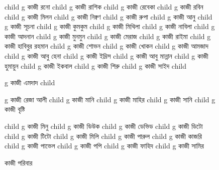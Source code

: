 \documentclass{article}
\begin{document}
\begin{figure}
{\begin{genealogypicture}
{{{{              child{    g{ কাজী রনো  } child{    g{ কাজী রাশিক  }   }   }
              child{    g{ কাজী রেবেকা } 
                  child{    g{ কাজী রবিন }   }
                  child{    g{ কাজী মিলন }   }
                  child{    g{ কাজী নিক্বণ }   }
                  child{    g{ কাজী রুপা }   }
              }
              child{    g{ কাজী আনু  } child{    g{ কাজী সূচনা }   }  }
              child{    g{ কাজী কুমকুম}
                    child{    g{ কাজী মিথিলা}   }
                    child{    g{ কাজী নাবিলা }   }
                    child{    g{ কাজী আদনান }   }
              }
              child{    g{ কাজী মুনমুন }
                  child{    g{ কাজী মেরাজ }   }
                  child{    g{ কাজী রাইমা }   }
              }
          }
          child{    g{ কাজী হাবিবুর রহমান }  
              child{    g{ কাজী শোভন }   }
              child{    g{ কাজী খোকন }   }
          }
          child{    g{ কাজী আমজাদ } 
          child{    g{ কাজী আবু হেনা }   }
          child{    g{ কাজী ইদ্রিস }   }
          child{    g{ কাজী আবু মান্নান }   }
          child{    g{ কাজী হুমায়ুন }   }
          child{    g{ কাজী ইকবাল }   }
          child{    g{ কাজী শিরু }   }
          child{    g{ কাজী সাইদ }   }
          }
          child{    g{ কাজী এমদাদ } 
              child{    g{ কাজী রেজা আলী } 
                    child{    g{ কাজী মানি }
                        child{    g{ কাজী মাহির   }     }
                          }
                    child{    g{ কাজী সানি } child{    g{ কাজী বৃষ্টি  }     }  }

              }
              child{    g{ কাজী মিনু  } 
              child{    g{ কাজী ডিউক }   }
              child{    g{ কাজী ডেভিড }   }
              child{    g{ কাজী ডিটো }   }
              child{    g{ কাজী টিটো }   }
              }
              child{    g{ কাজী মিলি }   }
              child{    g{ কাজী পারুল }
                  child{    g{ কাজী কাজরি }   }
                  child{    g{ কাজী পাভেল }   }
              }
              child{    g{ কাজী পপি }
                  child{    g{ কাজী ফাহিদ }   }
                  child{    g{ কাজী সামির }   }
              }

          }

      }
    }
    }
    \end{genealogypicture}
    }
    \begin{comment}
      child{
        g{ কাজী }

      }
      \end{comment}
    \caption{কাজী পরিবার}
    \end{figure}
    
\end{document}
